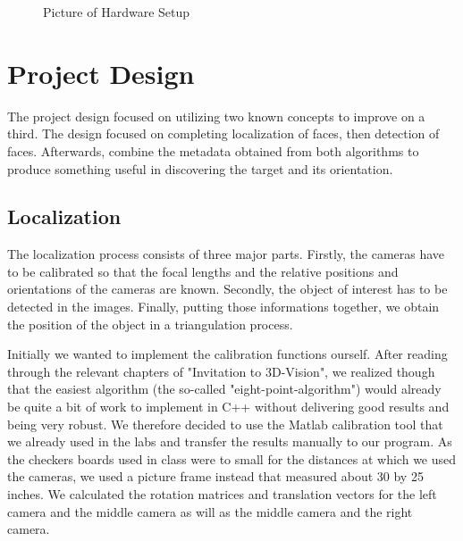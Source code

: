 \documentclass{acm_proc_article-sp}
\begin{document}
	\begin{figure}
		\centering
		\hfill
		\caption{\label{fig:setup}Picture of Hardware Setup}
	\end{figure}

\section{Project Design}
The project design focused on utilizing two known concepts to improve on a third.
The design focused on completing localization of faces, then detection of faces.  Afterwards,
combine the metadata obtained from both algorithms to produce something useful in discovering the target and its orientation.

\subsection{Localization}
The localization process consists of three major parts. Firstly, the cameras have to be calibrated so that the focal lengths and the relative positions and orientations of the cameras are known. Secondly, the object of interest has to be detected in the images. Finally, putting those informations together, we obtain the position of the object in a triangulation process.

Initially we wanted to implement the calibration functions ourself. After reading through the relevant chapters of "Invitation to 3D-Vision", we realized though that the easiest algorithm (the so-called "eight-point-algorithm") would already be quite a bit of work to implement in C++ without delivering good results and being very robust. We therefore decided to use the Matlab calibration tool that we already used in the labs and transfer the results manually to our program. As the checkers boards used in class were to small for the distances at which we used the cameras, we used a picture frame instead that measured about 30 by 25 inches. We calculated the rotation matrices and translation vectors for the left camera and the middle camera as will as the middle camera and the right camera.
\end{document}
